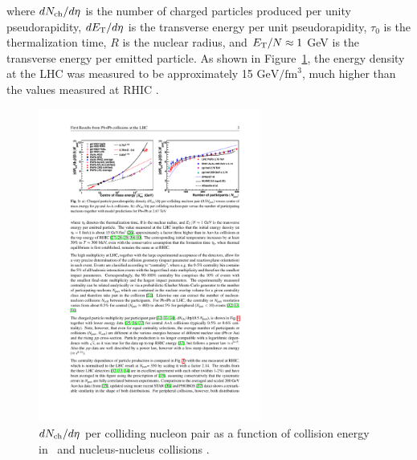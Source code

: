 where $d\mbox{$N_{\mathrm{ch}}$}/d\eta$ is the number of charged particles produced per unity pseudorapidity, $d\mbox{$E_{\mathrm{T}}$}/d\eta$ is the transverse energy per unit pseudorapidity, $\tau_0$ is the thermalization time, $R$ is the nuclear radius, and $\mbox{$E_{\mathrm{T}}$}/N \approx 1$ GeV is the transverse energy per emitted particle. As shown in Figure~\ref{fig:energyDensity}, the energy density at the LHC was measured to be approximately 15 $\mathrm{GeV} / \mathrm{fm}^3$, much higher than the values measured at RHIC \cite{Adcox:2004mh, Krajcz_r_2011}.




\begin{figure}[htbp]
\begin{center}
\includegraphics[width=0.65\textwidth]{figures/theory/energyDensity}
\caption{$d\mbox{$N_{\mathrm{ch}}$}/d\eta$ per colliding nucleon pair as a function of collision energy in \pp\ and nucleus-nucleus collisions \cite{Muller:2012zq}. }
\label{fig:energyDensity}
\end{center}
\end{figure}























